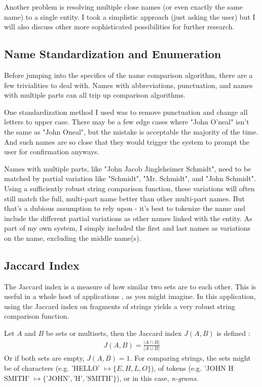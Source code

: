 \documentclass[11pt]{article}
\begin{document}
Another problem is resolving multiple close names (or even exactly the same name) to a single entity.
I took a simplistic approach (just asking the user) but I will also discuss other more
sophisticated possibilities for further research. 

\subsection{Name Standardization and Enumeration}
Before jumping into the specifics of the name comparison algorithm, there are a few trivialities
to deal with. Names with abbreviations, punctuation, and names with multiple parts can all
trip up comparison algorithms.

One standardization method I used was to remove punctuation and change all letters to upper case.
There may be a few edge cases where "John O'neal" isn't the same as "John Oneal",
but the mistake is acceptable the majority of the time. And such names are so close that they would
trigger the system to prompt the user for confirmation anyways.

Names with multiple parts, like "John Jacob Jingleheimer Schmidt", need to be matched by
partial variation like "Schmidt", "Mr. Schmidt", and "John Schmidt". 
Using a sufficiently robust string comparison function, these variations will often 
still match the full, multi-part name better than other multi-part names.
But that's a dubious assumption to rely upon - it's best to tokenize the name and
include the different partial variations as other names linked with the entity.
As part of my own system, I simply included the first and last names as variations on
the name, excluding the middle name(s).

\subsection{Jaccard Index}
The Jaccard index is a measure of how similar two sets are to each other.
This is useful in a whole host of applications \cite{general}, as you might imagine. 
In this application, using the Jaccard index on fragments of strings yields a very
robust string comparison function.

Let $A$ and $B$ be sets or multisets, then the Jaccard index $J(A,B)$ is defined \cite{mining, comparison}:
\begin{align*}
    J(A, B) = \frac{\left| A \cap B \right|}{\left| A \cup B \right|}
\end{align*}
Or if both sets are empty, $J(A,B) = 1$.
For comparing strings, the sets might be of characters (e.g. 'HELLO' $\mapsto \{E, H, L, O\}$), 
of tokens (e.g. 'JOHN H SMITH' $\mapsto \{\text{'JOHN'}, \text{'H'}, \text{'SMITH'}\}$),
or in this case, {\em n-grams}.
\end{document}
